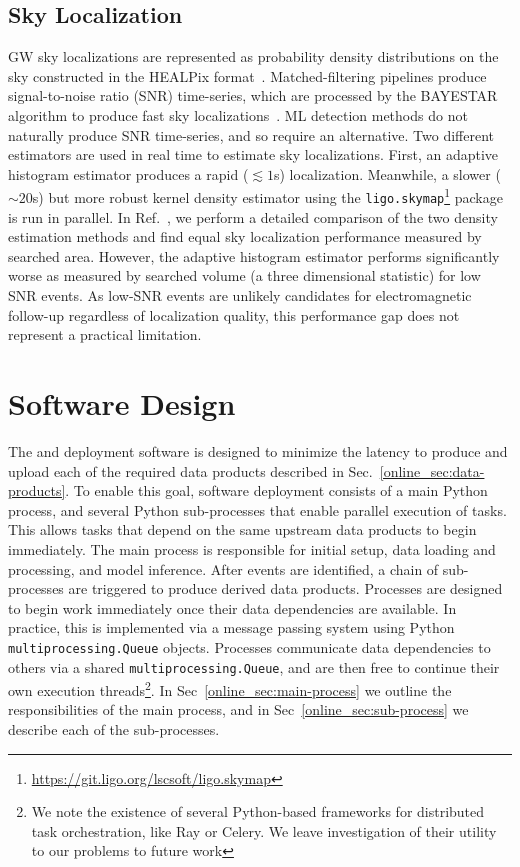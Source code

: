 \begin{refsection}
\subsection{Sky Localization}
GW sky localizations are represented as probability density distributions on the sky constructed in the HEALPix format~\cite{Fernique}. 
Matched-filtering pipelines produce signal-to-noise ratio (SNR) time-series, which are processed by the BAYESTAR algorithm to produce fast sky localizations~\cite{Singer_2016}.
ML detection methods do not naturally produce SNR time-series, and so require an alternative. 
Two different estimators are used in real time to estimate sky localizations. 
First, an adaptive histogram estimator produces a rapid ($\lesssim 1$s) localization. 
Meanwhile, a slower ($\sim 20$s) but more robust kernel density estimator using the \texttt{ligo.skymap}\footnote{\url{https://git.ligo.org/lscsoft/ligo.skymap}} package is run in parallel. 
In Ref.~\cite{Marx:2025ioo}, we perform a detailed comparison of the two density estimation methods and find equal sky localization performance measured by searched area. 
However, the adaptive histogram estimator performs significantly worse as measured by searched volume (a three dimensional statistic) for low SNR events.
As low-SNR events are unlikely candidates for electromagnetic follow-up regardless of localization quality, this performance gap does not represent a practical limitation.

\section{Software Design} \label{online_sec:software-arch}
The \aframe and \amplfi deployment software is designed to minimize the latency to produce and upload each of the required data products described in Sec.~\ref{online_sec:data-products}. 
To enable this goal, software deployment consists of a main Python process, and several Python sub-processes that enable parallel execution of tasks. 
This allows tasks that depend on the same upstream data products to begin immediately. 
The main process is responsible for initial setup, data loading and processing, and model inference. 
After events are identified, a chain of sub-processes are triggered to produce derived data products. 
Processes are designed to begin work immediately once their data dependencies are available. 
In practice, this is implemented via a message passing system using Python \texttt{multiprocessing.Queue} objects.
Processes communicate data dependencies to others via a shared \texttt{multiprocessing.Queue}, and are then free to continue their own execution threads\footnote{We note the existence of several Python-based frameworks for distributed task orchestration, like Ray or Celery. We leave investigation of their utility to our problems to future work}. 
In Sec~\ref{online_sec:main-process} we outline the responsibilities of the main process, and in Sec~\ref{online_sec:sub-process} we describe each of the sub-processes.


\end{refsection}
